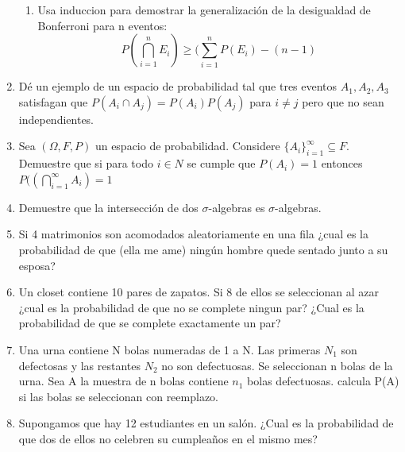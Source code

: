 \documentclass[12pt,a4paper]{report}
\begin{document}
\begin{enumerate}
{\begin{enumerate}[label=\alph*) ]
   \item {
 Usa induccion para demostrar la generalización de la desigualdad de Bonferroni para n eventos:\\
 $$P(\bigcap\limits_{i=1}^{n} E_{i}) \geq (\sum_{i=1}^{n} P(E_{i})-(n-1)$$

   }




	\end{enumerate}
	}

  \item{
  Dé un ejemplo de un espacio de probabilidad tal que tres eventos $A_{1},A_{2},A_{3}$ satisfagan que $P(A_{i} \cap A_{j})=P(A_{i})P(A_{j})$ para $i\neq j$ pero que no sean independientes.
  }


  \item{
 Sea $(\Omega, F, P)$ un espacio de probabilidad. Considere $\lbrace A_{i} \rbrace_{i=1}^{\infty} \subseteq F$. Demuestre que si para todo $i \in N$ se cumple que $P(A_{i})=1$ entonces $P((\bigcap\limits_{i=1}^{\infty}A_{i})=1$
  }

  \item{
 Demuestre que la intersección de dos $\sigma$-algebras es $\sigma$-algebras.
  }


  \item{
Si 4 matrimonios son acomodados aleatoriamente en una fila ¿cual es la probabilidad de que (ella me ame) ningún hombre quede sentado junto a su esposa?
  }

  \item{
Un closet contiene 10 pares de zapatos. Si 8 de ellos se seleccionan al azar ¿cual es la probabilidad de que no se complete ningun par? ¿Cual es la probabilidad de que se complete exactamente un par?
  }

  \item{
	Una urna contiene N  bolas numeradas de 1 a N. Las primeras $N_{1}$ son defectosas y las restantes $N_{2}$ no son defectuosas. Se seleccionan n bolas de la urna. Sea A la muestra de n bolas contiene $n_{1}$ bolas defectuosas. calcula P(A) si las bolas se seleccionan con reemplazo.
  }

  \item{
	Supongamos que hay 12 estudiantes en un salón. ¿Cual es la probabilidad de que dos de ellos no celebren su cumpleaños en el mismo mes?
  }





\end{enumerate}
\end{document}
